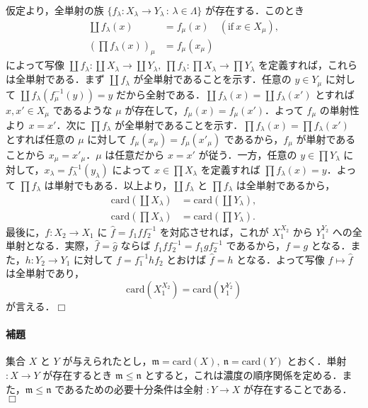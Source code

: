 \documentclass[b5paper,pandoc]{bxjsarticle}
\let\oldparagraph\paragraph
\renewcommand{\paragraph}[1]{\oldparagraph{#1}\mbox{}}
\begin{document}
仮定より，全単射の族
\(\{ f_\lambda \colon X_\lambda \to Y_\lambda \,:\,\lambda \in \Lambda \}\)
が存在する．このとき \begin{align*}
\coprod f_\lambda (x) &= f_{\mu}(x) \quad (\text{if}\ x \in X_\mu),\\
\left(\prod f_\lambda (x)\right)_\mu &= f_\mu (x_\mu)
\end{align*} によって写像
\(\coprod f_\lambda \colon \coprod X_\lambda \to \coprod Y_\lambda,\ \prod f_\lambda \colon \prod X_\lambda \to \prod Y_\lambda\)
を定義すれば，これらは全単射である．まず \(\coprod f_\lambda\)
が全単射であることを示す．任意の \(y \in Y_\mu\) に対して
\(\coprod f_\lambda(f_\mu^{-1}(y)) = y\)
だから全射である．\(\coprod f_\lambda (x) = \coprod f_\lambda (x')\)
とすれば \(x, x' \in X_\mu\) であるような \(\mu\)
が存在して，\(f_\mu (x) = f_\mu (x')\)．よって \(f_\mu\) の単射性より
\(x = x'\)．次に \(\prod f_\lambda\)
が全単射であることを示す．\(\prod f_\lambda (x) = \prod f_\lambda (x')\)
とすれば任意の \(\mu\) に対して \(f_\mu(x_\mu) = f_\mu (x'_\mu)\)
であるから，\(f_\mu\) が単射であることから \(x_\mu = x'_\mu\)．\(\mu\)
は任意だから \(x = x'\) が従う．一方，任意の \(y \in \prod Y_\lambda\)
に対して，\(x_\lambda = f_\lambda^{-1}(y_\lambda)\) によって
\(x \in \prod X_\lambda\) を定義すれば
\(\prod f_\lambda (x) = y\)．よって \(\prod f_\lambda\)
は単射でもある．以上より，\(\coprod f_\lambda\) と \(\prod f_\lambda\)
は全単射であるから， \begin{align*}
\mathrm{card}(\coprod X_\lambda) &= \mathrm{card}(\coprod Y_\lambda),\\
\mathrm{card}(\prod X_\lambda) &= \mathrm{card}(\prod Y_\lambda).
\end{align*} 最後に，\(f \colon X_2 \to X_1\) に
\(\hat f = f_1ff_2^{-1}\) を対応させれば，これが \(X_1^{X_2}\) から
\(Y_1^{Y_2}\) への全単射となる．実際，\(\hat f = \hat g\) ならば
\(f_1ff_2^{-1} = f_1gf_2^{-1}\) であるから，\(f = g\)
となる．また，\(h \colon Y_2 \to Y_1\) に対して \(f = f_1^{-1}hf_2\)
とおけば \(\hat f = h\) となる．よって写像 \(f \mapsto \hat f\)
は全単射であり， \[
\mathrm{card}(X_1^{X_2}) = \mathrm{card}(Y_1^{Y_2})
\] が言える．\(\Box\)

\hypertarget{ux88dcux984c-1}{%
\paragraph{補題}\label{ux88dcux984c-1}}

集合 \(X\) と \(Y\)
が与えられたとし，\(\mathfrak m = \mathrm{card}(X),\ \mathfrak n = \mathrm{card}(Y)\)
とおく．単射 \(\colon X \to Y\) が存在するとき
\(\mathfrak m \leqslant\mathfrak n\)
とすると，これは濃度の順序関係を定める．また，\(\mathfrak m \leqslant\mathfrak n\)
であるための必要十分条件は全射 \(\colon Y \to X\)
が存在することである．\(\Box\)
\end{document}
